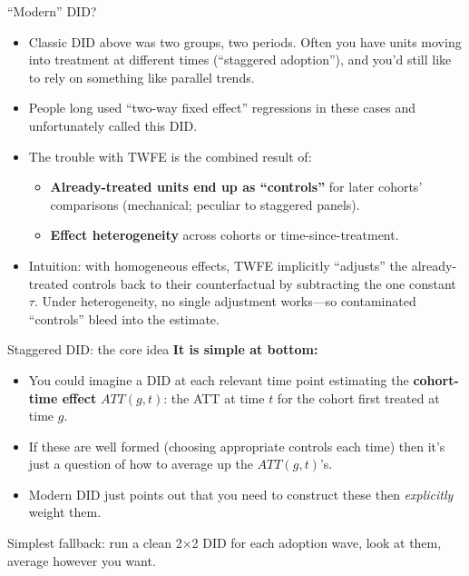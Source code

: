 \documentclass[xcolor=dvipsnames]{beamer}
\begin{document}
\begin{frame}{``Modern'' DID?}
\small
\begin{itemize}
\item<1-> Classic DID above was two groups, two periods. Often you have units moving into treatment at different times (``staggered adoption''), and you'd still like to rely on something like parallel trends.
\item<2-> People long used ``two-way fixed effect'' regressions in these cases and unfortunately called this DID.
\item<3-> The trouble with TWFE is the combined result of:
\begin{itemize}
\footnotesize
\item<4-> \textbf{Already-treated units end up as ``controls''} for later cohorts' comparisons (mechanical; peculiar to staggered panels).
\item<5-> \textbf{Effect heterogeneity} across cohorts or time-since-treatment.
\end{itemize}
\item<6-> Intuition: with homogeneous effects, TWFE implicitly ``adjusts'' the already-treated controls back to their counterfactual by subtracting the one constant $\tau$. Under heterogeneity, no single adjustment works---so contaminated ``controls'' bleed into the estimate.
\end{itemize}
\end{frame}


\begin{frame}{Staggered DID: the core idea}
\small
\textbf{It is simple at bottom:}
\begin{itemize}
\item<1-> You could imagine a DID at each relevant time point estimating the \textbf{cohort-time effect} $ATT(g,t)$: the ATT at time $t$ for the cohort first treated at time $g$.\medskip
\item<2-> If these are well formed (choosing appropriate controls each time) then it's just a question of how to average up the $ATT(g,t)$'s.\medskip
\item<3-> Modern DID just points out that you need to construct these then \textit{explicitly} weight them.
\end{itemize}
\bigskip
{} Simplest fallback: run a clean 2$\times$2 DID for each adoption wave, look at them, average however you want.
\end{frame}
\end{document}
